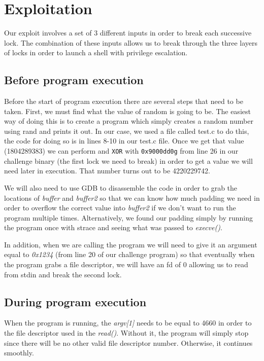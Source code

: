 \section{Exploitation}
\label{sec:exploitation}
Our exploit involves a set of 3 different inputs in order to break each successive lock. The combination of these inputs allows us to break through the three layers of locks in order to launch a shell with privilege escalation. 

\subsection{Before program execution}
Before the start of program execution there are several steps that need to be taken. First, we must find what the value of random is going to be. The easiest way of doing this is to create a program which simply creates a random number using rand and prints it out. In our case, we used a file called test.c to do this, the code for doing so is in lines 8-10 in our test.c file. Once we get that value (1804289383) we can perform and {\tt XOR} with {\tt 0x9000dd0g} from line 26 in our challenge binary (the first lock we need to break) in order to get a value we will need later in execution. That number turns out to be 4220229742.

We will also need to use GDB to disassemble the code in order to grab the locations of \emph{buffer} and \emph{buffer2} so that we can know how much padding we need in order to overflow the correct value into \emph{buffer2} if we don't want to run the program multiple times. Alternatively, we found our padding simply by running the program once with strace and seeing what was passed to \emph{execve()}. 

In addition, when we are calling the program we will need to give it an argument equal to \emph{0x1234} (from line 20 of our challenge program) so that eventually when the program grabs a file descriptor, we will have an fd of 0 allowing us to read from stdin and break the second lock.

\subsection{During program execution}
When the program is running, the \emph{argv[1]} needs to be equal to 4660 in order to the file descriptor used in the \emph{read()}. Without it, the program will simply stop since there will be no other valid file descriptor number. Otherwise, it continues smoothly.

